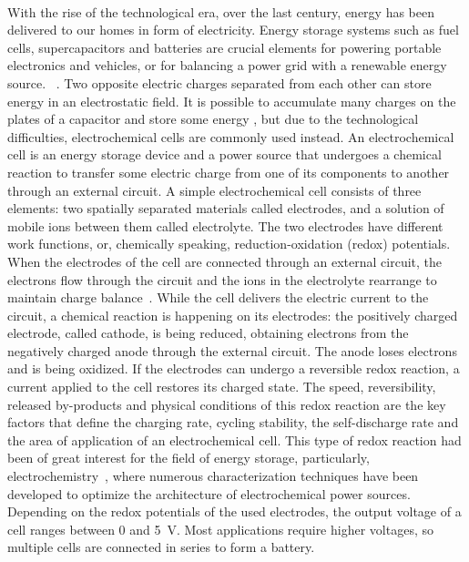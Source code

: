 \paragraph*{}
With the rise of the technological era, over the last century, energy has been delivered to our homes in form of electricity. Energy storage systems such as fuel cells, supercapacitors and batteries are crucial elements for powering portable electronics and vehicles, or for balancing a power grid with a renewable energy source. ~\cite{janoschka2012_advmater}. Two opposite electric charges separated from each other can store energy in an electrostatic field. It is possible to accumulate many charges on the plates of a capacitor and store some energy \cite{supercaps_review}, but due to the technological difficulties, electrochemical cells are commonly used instead. An electrochemical cell is an energy storage device and a power source that undergoes a chemical reaction to transfer some electric charge from one of its components to another through an external circuit. A simple electrochemical cell consists of three elements: two spatially separated materials called electrodes, and a solution of mobile ions between them called electrolyte. The two electrodes have different work functions, or, chemically speaking, reduction-oxidation (redox) potentials. When the electrodes of the cell are connected through an external circuit, the electrons flow through the circuit and the ions in the electrolyte rearrange to maintain charge balance~\cite{muench2016_chemrev}. While the cell delivers the electric current to the circuit, a chemical reaction is happening on its electrodes: the positively charged electrode, called cathode, is being reduced, obtaining electrons from the negatively charged anode through the external circuit. The anode loses electrons and is being oxidized. If the electrodes can undergo a reversible redox reaction, a current applied to the cell restores its charged state. The speed, reversibility, released by-products and physical conditions of this redox reaction are the key factors that define the charging rate, cycling stability, the self-discharge rate and the area of application of an electrochemical cell. This type of redox reaction had been of great interest for the field of energy storage, particularly, electrochemistry~\cite{echem_book}, where numerous characterization techniques have been developed to optimize the architecture of electrochemical power sources. Depending on the redox potentials of the used electrodes, the output voltage of a cell ranges between 0 and 5~V. Most applications require higher voltages, so multiple cells are connected in series to form a battery.\\
